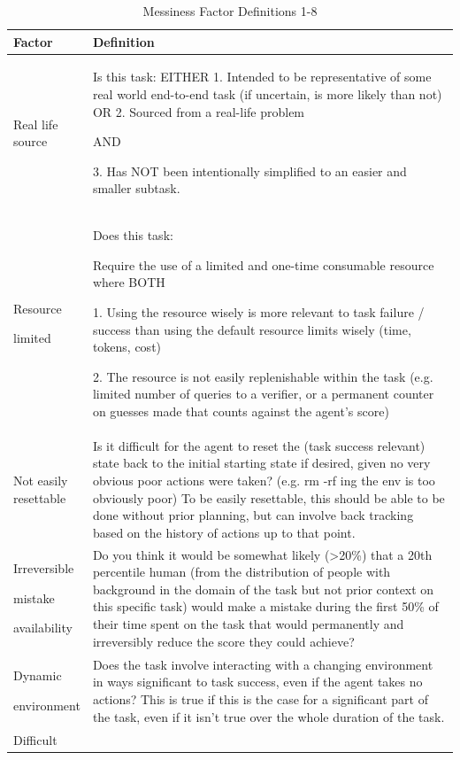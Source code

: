 \documentclass{article}
\begin{document}
\begin{table}
\centering
\caption{Messiness Factor Definitions 1-8}
\label{table:messiness_definitions_1}
\small
\begin{tabular}{p{0.15\linewidth}p{0.85\linewidth}}
\hline
\textbf{Factor} & \textbf{Definition} \\
\hline
Real life source & Is this task: EITHER 1. Intended to be representative of some real world end-to-end task (if uncertain, is more likely than not) OR 2. Sourced from a real-life problem 

AND

3. Has NOT been intentionally simplified to an easier and smaller subtask. \\
\hline
Resource

limited & Does this task:

Require the use of a limited and one-time consumable resource where BOTH

1. Using the resource wisely is more relevant to task failure / success than using the default resource limits wisely (time, tokens, cost)

2. The resource is not easily replenishable within the task
(e.g. limited number of queries to a verifier, or a permanent counter on guesses made that counts against the agent's score)\\
\hline
Not easily resettable & Is it difficult for the agent to reset the (task success relevant) state back to the initial starting state if desired, given no very obvious poor actions were taken? (e.g. rm -rf ing the env is too obviously poor) To be easily resettable, this should be able to be done without prior planning, but can involve back tracking based on the history of actions up to that point. \\
\hline
Irreversible

mistake

availability & Do you think it would be somewhat likely (\textgreater20\%) that a 20th percentile human (from the distribution of people with background in the domain of the task but not prior context on this specific task) would make a mistake during the first 50\% of their time spent on the task that would permanently and irreversibly reduce the score they could achieve? \\
\hline
Dynamic

environment & Does the task involve interacting with a changing environment in ways significant to task success, even if the agent takes no actions? This is true if this is the case for a significant part of the task, even if it isn't true over the whole duration of the task. \\
\hline
Difficult


\end{tabular}
\end{table}
\end{document}

